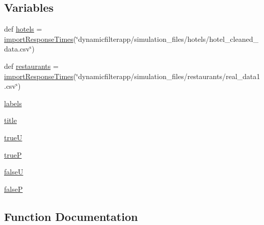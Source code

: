 \subsection*{Variables}
\begin{DoxyCompactItemize}
\item 
def \mbox{\hyperlink{namespacedynamicfilterapp_1_1simulation__files_1_1response_time_distribution_a5dc6ecb2720239630808a8ab06ab1840}{hotels}} = \mbox{\hyperlink{namespacedynamicfilterapp_1_1simulation__files_1_1response_time_distribution_ae93872086b32d303395dd0b753af1775}{import\+Response\+Times}}(\char`\"{}dynamicfilterapp/simulation\+\_\+files/hotels/hotel\+\_\+cleaned\+\_\+data.\+csv\char`\"{})
\item 
def \mbox{\hyperlink{namespacedynamicfilterapp_1_1simulation__files_1_1response_time_distribution_a6caf9f682a37695b1f6baf64018c2994}{restaurants}} = \mbox{\hyperlink{namespacedynamicfilterapp_1_1simulation__files_1_1response_time_distribution_ae93872086b32d303395dd0b753af1775}{import\+Response\+Times}}(\char`\"{}dynamicfilterapp/simulation\+\_\+files/restaurants/real\+\_\+data1.\+csv\char`\"{})
\item 
\mbox{\hyperlink{namespacedynamicfilterapp_1_1simulation__files_1_1response_time_distribution_abc325fc13d4194905c1786e24ee447f0}{labels}}
\item 
\mbox{\hyperlink{namespacedynamicfilterapp_1_1simulation__files_1_1response_time_distribution_a051e403214cb6872ad3fe4e50302a6ee}{title}}
\item 
\mbox{\hyperlink{namespacedynamicfilterapp_1_1simulation__files_1_1response_time_distribution_afe318a0d18adb188fae94936f9b1d853}{trueU}}
\item 
\mbox{\hyperlink{namespacedynamicfilterapp_1_1simulation__files_1_1response_time_distribution_ae1891527aefb6a817d15668b0b1c0d6c}{trueP}}
\item 
\mbox{\hyperlink{namespacedynamicfilterapp_1_1simulation__files_1_1response_time_distribution_a0ab373b74e15cafdfd1ad2c58549a7c1}{falseU}}
\item 
\mbox{\hyperlink{namespacedynamicfilterapp_1_1simulation__files_1_1response_time_distribution_aa7f017430863ea8855038593e0853b30}{falseP}}
\end{DoxyCompactItemize}


\subsection{Function Documentation}
\mbox{\label{namespacedynamicfilterapp_1_1simulation__files_1_1response_time_distribution_ae93872086b32d303395dd0b753af1775}} 
